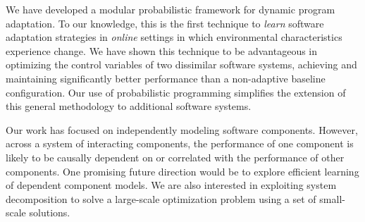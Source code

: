 \documentclass[letterpaper]{article}
\begin{document}
We have developed a modular probabilistic framework for dynamic program adaptation.
To our knowledge, this is the first technique to \emph{learn} software adaptation strategies in \emph{online} settings in which environmental characteristics experience change.
We have shown this technique to be advantageous in optimizing the control variables of two dissimilar software systems, achieving and maintaining significantly better performance than a non-adaptive baseline configuration.
Our use of probabilistic programming simplifies the extension of this general methodology to additional software systems.

Our work has focused on independently modeling software components.
However, across a system of interacting components, the performance of one component is likely to be causally dependent on or correlated with the performance of other components.
One promising future direction would be to explore efficient learning of dependent component models.
We are also interested in exploiting system decomposition to solve a large-scale optimization problem using a set of small-scale solutions.



\end{document}
